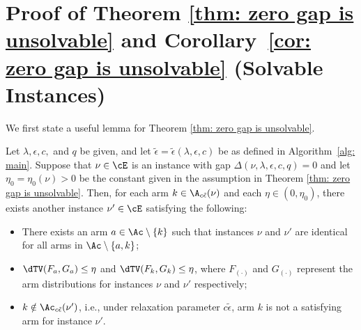 \section{Proof of Theorem \ref{thm: zero gap is unsolvable} and Corollary~\ref{cor: zero gap is unsolvable} (Solvable Instances)}
\label{sec: appendix solvable instance}

We first state a useful lemma for Theorem \ref{thm: zero gap is unsolvable}.

\begin{lemma} 
\label{lem:two_instances}
        Let $\lambda, \epsilon, c,$ and $q$ be given, 
        and let $\tilde{\epsilon} = \tilde{\epsilon}(\lambda, \epsilon, c)$ be as defined in 
        Algorithm~\ref{alg: main}.
        Suppose that $\nu \in \cE$ is an instance with gap $\Delta(\nu, \lambda, \epsilon, c, q) = 0 $ and let $\eta_0 = \eta_0(\nu) > 0$ be the constant given in the assumption in Theorem \ref{thm: zero gap is unsolvable}.  
        Then, for each arm $k \in \A_{c \tilde{\epsilon}}(\nu)$ and each $\eta \in  (0, \eta_0) $, there exists another instance $\nu' \in \cE$ satisfying the following:
    \begin{itemize}[topsep=0pt, itemsep=0pt]
        \item There exists an arm $a \in \Ac \setminus \{k\}$ such that instances $\nu$ and $\nu'$ are identical for all arms in $\Ac \setminus \{a,k\}$;
        
        \item $\dTV(F_a,G_a) \le \eta$ and $\dTV(F_k,G_k) \le \eta$, where $F_{(\cdot)}$ and $G_{(\cdot)}$ represent the arm distributions for instances $\nu$ and $\nu'$ respectively;
        
        \item $k \notin \Ac_{c \tilde{\epsilon} }(\nu')$, i.e., 
        under relaxation parameter $c \tilde{\epsilon}$, arm $k$ is not a satisfying arm for instance $\nu'$.
    \end{itemize}
\end{lemma}

